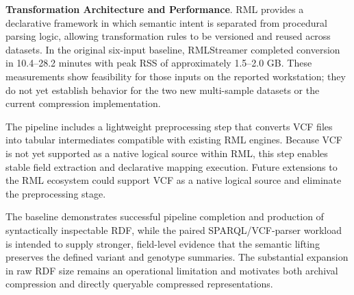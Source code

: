 \documentclass[pdflatex,sn-mathphys-num]{sn-jnl}%
\newenvironment{revision}{\begingroup\color{revisionblue}}{\endgroup}%
\theoremstyle{thmstyleone}%
\theoremstyle{thmstyletwo}%
\theoremstyle{thmstylethree}%
\begin{document}
\begin{revision}
\textbf{Transformation Architecture and Performance}.
RML provides a declarative framework in which semantic intent is separated from procedural parsing logic, allowing transformation rules to be versioned and reused across datasets. In the original six-input baseline, RMLStreamer completed conversion in 10.4--28.2 minutes with peak RSS of approximately 1.5--2.0 GB. These measurements show feasibility for those inputs on the reported workstation; they do not yet establish behavior for the two new multi-sample datasets or the current compression implementation.

The pipeline includes a lightweight preprocessing step that converts VCF files into tabular intermediates compatible with existing RML engines. Because VCF is not yet supported as a native logical source within RML, this step enables stable field extraction and declarative mapping execution. Future extensions to the RML ecosystem could support VCF as a native logical source and eliminate the preprocessing stage.

The baseline demonstrates successful pipeline completion and production of syntactically inspectable RDF, while the paired SPARQL/VCF-parser workload is intended to supply stronger, field-level evidence that the semantic lifting preserves the defined variant and genotype summaries. The substantial expansion in raw RDF size remains an operational limitation and motivates both archival compression and directly queryable compressed representations.
\end{revision}
\end{document}
